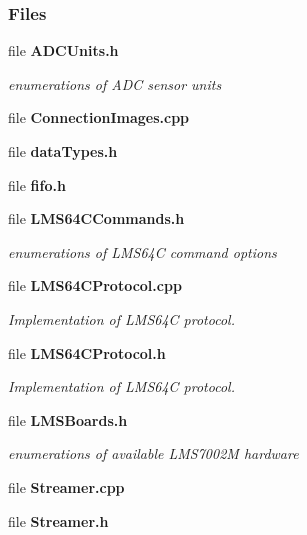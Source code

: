 \subsubsection*{Files}
\begin{DoxyCompactItemize}
\item 
file {\bf A\+D\+C\+Units.\+h}
\begin{DoxyCompactList}\small\item\em enumerations of A\+DC sensor units \end{DoxyCompactList}\item 
file {\bf Connection\+Images.\+cpp}
\item 
file {\bf data\+Types.\+h}
\item 
file {\bf fifo.\+h}
\item 
file {\bf L\+M\+S64\+C\+Commands.\+h}
\begin{DoxyCompactList}\small\item\em enumerations of L\+M\+S64C command options \end{DoxyCompactList}\item 
file {\bf L\+M\+S64\+C\+Protocol.\+cpp}
\begin{DoxyCompactList}\small\item\em Implementation of L\+M\+S64C protocol. \end{DoxyCompactList}\item 
file {\bf L\+M\+S64\+C\+Protocol.\+h}
\begin{DoxyCompactList}\small\item\em Implementation of L\+M\+S64C protocol. \end{DoxyCompactList}\item 
file {\bf L\+M\+S\+Boards.\+h}
\begin{DoxyCompactList}\small\item\em enumerations of available L\+M\+S7002M hardware \end{DoxyCompactList}\item 
file {\bf Streamer.\+cpp}
\item 
file {\bf Streamer.\+h}
\end{DoxyCompactItemize}
